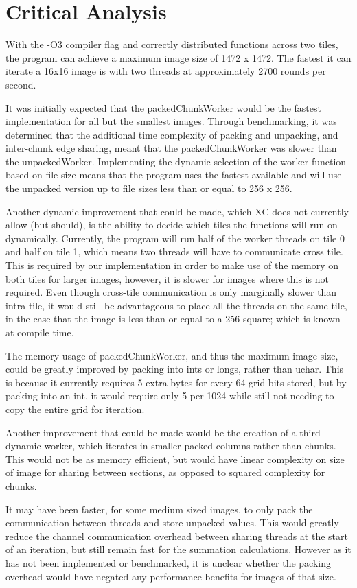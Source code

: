 \documentclass[11pt, oneside]{article}
\begin{document}
\pagebreak
\section{Critical Analysis}
With the -O3 compiler flag and correctly distributed functions across two tiles, the program can achieve a maximum image size of 1472 x 1472. The fastest it can iterate a 16x16 image is with two threads at approximately 2700 rounds per second.

It was initially expected that the packedChunkWorker would be the fastest implementation for all but the smallest images. Through benchmarking, it was determined that the additional time complexity of packing and unpacking, and inter-chunk edge sharing, meant that the packedChunkWorker was slower than the unpackedWorker. Implementing the dynamic selection of the worker function based on file size means that the program uses the fastest available and will use the unpacked version up to file sizes less than or equal to 256 x 256.

Another dynamic improvement that could be made, which XC does not currently allow (but should), is the ability to decide which tiles the functions will run on dynamically. Currently, the program will run half of the worker threads on tile 0 and half on tile 1, which means two threads will have to communicate cross tile. This is required by our implementation in order to make use of the memory on both tiles for larger images, however, it is slower for images where this is not required. Even though cross-tile communication is only marginally slower than intra-tile, it would still be advantageous to place all the threads on the same tile, in the case that the image is less than or equal to a 256 square; which is known at compile time.

The memory usage of packedChunkWorker, and thus the maximum image size, could be greatly improved by packing into ints or longs, rather than uchar. This is because it currently requires 5 extra bytes for every 64 grid bits stored, but by packing into an int, it would require only 5 per 1024 while still not needing to copy the entire grid for iteration.

Another improvement that could be made would be the creation of a third dynamic worker, which iterates in smaller packed columns rather than chunks. This would not be as memory efficient, but would have linear complexity on size of image for sharing between sections, as opposed to squared complexity for chunks.

It may have been faster, for some medium sized images, to only pack the communication between threads and store unpacked values. This would greatly reduce the channel communication overhead between sharing threads at the start of an iteration, but still remain fast for the summation calculations. However as it has not been implemented or benchmarked, it is unclear whether the packing overhead would have negated any performance benefits for images of that size.
\end{document}
